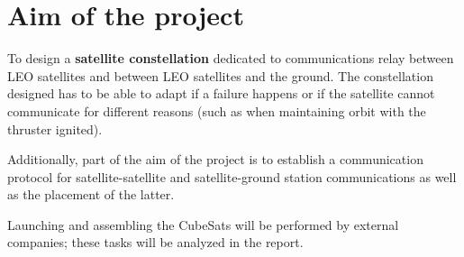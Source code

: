 \chapter{Aim of the project}
To design a \textbf{satellite constellation} dedicated to  communications relay between LEO satellites and between LEO satellites and the ground. The constellation designed has to be able to adapt if a failure happens or if the satellite cannot communicate for different reasons (such as when maintaining orbit with the thruster ignited).

Additionally, part of the aim of the project is to establish a communication protocol for satellite-satellite and satellite-ground station communications as well as the placement of the latter. 

Launching and assembling the CubeSats will be performed by external companies; these tasks will be analyzed in the report. 
